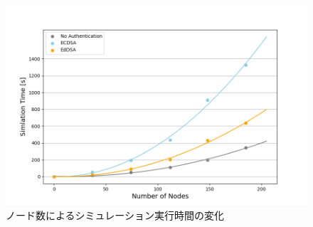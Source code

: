 \begin{figure}
  \centering
  \includegraphics[width=1\textwidth]{figures/exp3_simtime.png}
  \caption{ノード数によるシミュレーション実行時間の変化}
  \label{fig:exp3_simtime}
\end{figure}
\clearpage
\setlength{\tabcolsep}{4pt}
